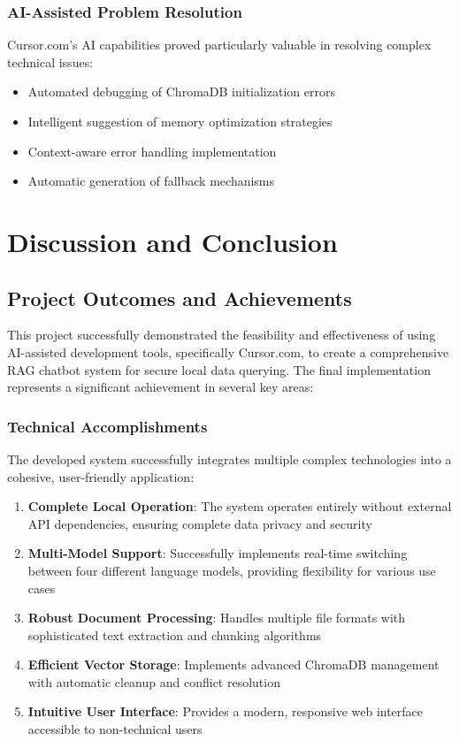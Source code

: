 \documentclass[12pt,letterpaper]{article}
\begin{document}
\subsubsection{AI-Assisted Problem Resolution}

Cursor.com's AI capabilities proved particularly valuable in resolving complex technical issues:

\begin{itemize}
    \item Automated debugging of ChromaDB initialization errors
    \item Intelligent suggestion of memory optimization strategies
    \item Context-aware error handling implementation
    \item Automatic generation of fallback mechanisms
\end{itemize}

\newpage

\section{Discussion and Conclusion}

\subsection{Project Outcomes and Achievements}

This project successfully demonstrated the feasibility and effectiveness of using AI-assisted development tools, specifically Cursor.com, to create a comprehensive RAG chatbot system for secure local data querying. The final implementation represents a significant achievement in several key areas:

\subsubsection{Technical Accomplishments}

The developed system successfully integrates multiple complex technologies into a cohesive, user-friendly application:

\begin{enumerate}
    \item \textbf{Complete Local Operation}: The system operates entirely without external API dependencies, ensuring complete data privacy and security
    \item \textbf{Multi-Model Support}: Successfully implements real-time switching between four different language models, providing flexibility for various use cases
    \item \textbf{Robust Document Processing}: Handles multiple file formats with sophisticated text extraction and chunking algorithms
    \item \textbf{Efficient Vector Storage}: Implements advanced ChromaDB management with automatic cleanup and conflict resolution
    \item \textbf{Intuitive User Interface}: Provides a modern, responsive web interface accessible to non-technical users
\end{enumerate}
\end{document}
